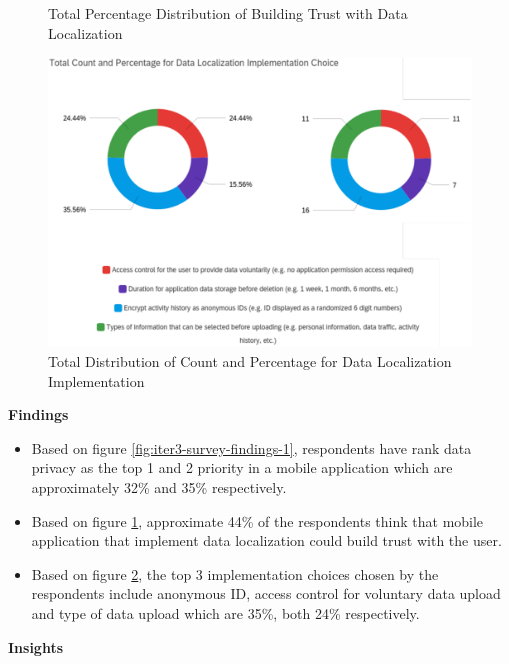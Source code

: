 \begin{enumerate}[a)]
\begin{itemize}
\begin{figure}[H]
                  \caption{Total Percentage Distribution of Building Trust with Data Localization}
                  \label{fig:iter3-survey-findings-2}
                \end{figure}
                \begin{figure}[H]
                  \centering
                  \includegraphics[width=\linewidth]{img/prototype/iter3-survey-findings-3.png}
                  \caption{Total Distribution of Count and Percentage for Data Localization Implementation}
                  \label{fig:iter3-survey-findings-3}
                \end{figure}
              \par \textbf{Findings}
              \begin{itemize}
                \item Based on figure \ref{fig:iter3-survey-findings-1}, respondents have rank data privacy as the top 1 and 2 priority in a mobile
                application which are approximately 32\% and 35\% respectively.
                \item Based on figure \ref{fig:iter3-survey-findings-2}, approximate 44\% of the respondents think that mobile application that implement
                data localization could build trust with the user.
                \item Based on figure \ref{fig:iter3-survey-findings-3}, the top 3 implementation choices chosen by the respondents include anonymous
                ID, access control for voluntary data upload and type of data upload which are 35\%, both 24\%
                respectively.
              \end{itemize}
              \par \textbf{Insights}

\end{itemize}
\end{enumerate}
